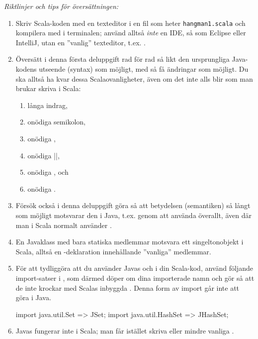 \noindent\emph{Riktlinjer och tips för översättningen:}

\begin{enumerate}[noitemsep]

\item Skriv Scala-koden med en texteditor i en fil som heter \texttt{hangman1.scala} och kompilera med  i terminalen; använd alltså \emph{inte} en IDE, så som Eclipse eller IntelliJ, utan en ''vanlig'' texteditor, t.ex. .

\item Översätt i denna första deluppgift rad för rad så likt den ursprungliga Java-kodens utseende (syntax)  som möjligt, med så få ändringar som möjligt. Du ska alltså ha kvar dessa Scalaovanligheter, även om det inte alls blir som man brukar skriva i Scala:
\begin{enumerate}
\item långa indrag, \item onödiga semikolon, \item onödiga \code{()}, \item onödiga \code|{}|, \item onödiga , och \item onödiga .
\end{enumerate}

\item Försök också i denna deluppgift göra så att betydelsen (semantiken) så långt som möjligt motsvarar den i Java, t.ex. genom att använda  överallt, även där man i Scala normalt använder .

\item En Javaklass med bara statiska medlemmar motsvara ett singeltonobjekt i Scala, alltså en -deklaration innehållande ''vanliga'' medlemmar.

\item För att tydliggöra att du använder Javas  och  i din Scala-kod, använd följande import-satser i , som därmed döper om dina importerade namn och gör så att de inte krockar med Scalas inbyggda . Denna form av import går inte att göra i Java.
\begin{Code}
import java.util.{Set => JSet};
import java.util.{HashSet => JHashSet};
\end{Code}

\item Javas  fungerar inte i Scala; man får istället skriva  eller mindre vanliga .


\end{enumerate}
